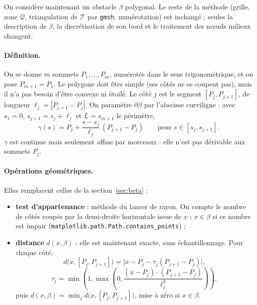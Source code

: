 \documentclass[11pt,a4paper]{article}
\begin{document}
On considère maintenant un obstacle $\beta$ polygonal. Le reste de la
méthode (grille, zone $\mathcal{Q}$, triangulation de $\mathcal{T}$ par
\texttt{gmsh}, numérotation) est inchangé ; seules la description de
$\beta$, la discrétisation de son bord et le traitement des nœuds milieux
changent.

\paragraph{Définition.} On se donne $m$ sommets $P_1, \dots, P_m$, numérotés
dans le sens trigonométrique, et on pose $P_{m+1} = P_1$. Le polygone doit
être simple (ses côtés ne se coupent pas), mais il n'a pas besoin d'être
convexe ni étoilé. Le côté $j$ est le segment $[P_j, P_{j+1}]$, de longueur
$\ell_j = |P_{j+1} - P_j|$. On paramètre $\partial\beta$ par l'abscisse
curviligne : avec $s_1 = 0$, $s_{j+1} = s_j + \ell_j$ et
$L = s_{m+1}$ le périmètre,
\[
\gamma(s) = P_j + \frac{s - s_j}{\ell_j}\,(P_{j+1} - P_j)
\qquad \text{pour } s \in [s_j, s_{j+1}] .
\]
$\gamma$ est continue mais seulement affine par morceaux : elle n'est pas
dérivable aux sommets $P_j$.

\begin{center}
\end{center}

\paragraph{Opérations géométriques.} Elles remplacent celles de la
section~\ref{sec:beta} :
\begin{itemize}
  \item \textbf{test d'appartenance} : méthode du lancer de rayon. On compte
        le nombre de côtés coupés par la demi-droite horizontale issue de
        $x$ ; $x \in \beta$ si ce nombre est impair
        (\texttt{matplotlib.path.Path.contains\_points}) ;
  \item \textbf{distance} $d(x,\beta)$ : elle est maintenant exacte, sans
        échantillonnage. Pour chaque côté,
        \[
        d\big(x, [P_j, P_{j+1}]\big) = \big|x - P_j - \tau_j (P_{j+1} - P_j)\big|,
        \]
        \[
        \tau_j = \min\!\left(1, \max\!\left(0,
        \frac{(x - P_j)\cdot(P_{j+1} - P_j)}{\ell_j^2}\right)\right),
        \]
        puis $d(x,\beta) = \min_j d\big(x, [P_j, P_{j+1}]\big)$, mise à zéro si
        $x \in \beta$.
\end{itemize}
\end{document}
